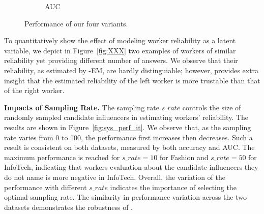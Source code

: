 \begin{figure}[htb]
\begin{subfigure}[t]{0.47\columnwidth}
    \vspace{-0.15in}
        \caption{AUC\label{fig:AUC}} 
    \end{subfigure}%
   \caption{Performance of our four variants.} \label{fig:variants}
\end{figure}

To quantitatively show the effect of modeling worker reliability as a latent variable, we depict in Figure~\ref{fig:XXX}  two examples of workers of similar reliability yet providing different number of answers. We observe that their reliability, as estimated by \sys-EM, are hardly distinguiable; however, \sys provides extra insight that the estimated reliability of the left worker is more trustable than that of the right worker.



\smallskip
\noindent\textbf{Impacts of Sampling Rate.}
The sampling rate $s\_rate$ controls the size of randomly sampled candidate influencers in estimating workers' reliability. The results are shown in Figure~\ref{fig:sys_perf_it}. We observe that, as the sampling rate varies from 0 to 100, the performance first increases then decreases. Such a result is consistent on both datasets, measured by both accuracy and AUC. The maximum performance is reached for $s\_rate= 10$ for Fashion and $s\_rate= 50$ for InfoTech, indicating that workers evaluation about the candidate influencers they do not name is more negative in InfoTech. Overall, the variation of the performance with different $s\_rate$ indicates the importance of selecting the optimal sampling rate. The similarity in performance variation across the two datasets demonstrates the robustness of \sys.

